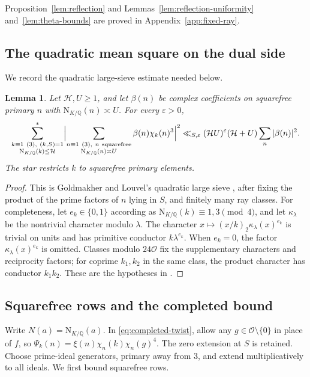 \documentclass[11pt,a4paper]{article}
\numberwithin{equation}{section}
\numberwithin{figure}{section}
\newtheorem{lemma}[theorem]{Lemma}
\theoremstyle{definition}
\theoremstyle{remark}
\newcommand{\Q}{\mathbb Q}
\newcommand{\NK}{\mathrm N_{K/\Q}}
\newcommand{\OO}{\mathcal O}
\begin{document}
Proposition~\ref{lem:reflection}
and Lemmas~\ref{lem:reflection-uniformity} and~\ref{lem:theta-bounds}
are proved in Appendix~\ref{app:fixed-ray}.

\subsection{The quadratic mean square on the dual side}
We record the quadratic large-sieve estimate needed below.

\begin{lemma}\label{lem:quadratic}
Let $\mathcal H,U\ge1$, and let $\beta(n)$ be complex coefficients
on squarefree primary $n$ with $\NK(n)\asymp U$.
For every $\varepsilon>0$,
\begin{equation}\label{eq:Q}
 \sum_{\substack{k\equiv1\ (3),\ (k,S)=1\\\NK(k)\le\mathcal H}}^*
 \Bigl|\sum_{\substack{n\equiv1\ (3),\ n\ {\rm squarefree}\\
                       \NK(n)\asymp U}}
       \beta(n)\chi_k(n)^3\Bigr|^2
 \ll_{S,\varepsilon}(\mathcal HU)^\varepsilon(\mathcal H+U)
       \sum_n|\beta(n)|^2.
\end{equation}
The star restricts $k$ to squarefree primary elements.
\end{lemma}
\begin{proof}
This is Goldmakher and Louvel's quadratic large sieve \cite[Theorem~1.1]{GL}, after
fixing the product of the prime factors of $n$ lying in $S$, and finitely many ray classes.
For completeness, let $e_k\in\{0,1\}$ according as
$\NK(k)\equiv1,3\pmod4$, and let $\kappa_\lambda$ be the nontrivial
character modulo $\lambda$. The character
$x\mapsto(x/k)_2\kappa_\lambda(x)^{e_k}$ is trivial on
units and has primitive conductor $k\lambda^{e_k}$.
When $e_k=0$, the factor $\kappa_\lambda(x)^{e_k}$ is omitted.
Classes modulo $24\OO$ fix the supplementary characters and
reciprocity factors; for coprime $k_1,k_2$ in the same class, the
product character has conductor $k_1k_2$.
These are the hypotheses in \cite[Definition~1 and \S2]{GL}.
\end{proof}

\subsection{Squarefree rows and the completed bound}
Write $N(a)=\NK(a)$. In \eqref{eq:completed-twist}, allow any
$g\in\OO\setminus\{0\}$ in place of $f$, so
$\Psi_k(n)=\xi(n)\chi_n(k)\chi_n(g)^4$.
The zero extension at $S$ is retained.
Choose prime-ideal generators, primary away from $3$, and extend
multiplicatively to all ideals. We first bound squarefree rows.
\end{document}
